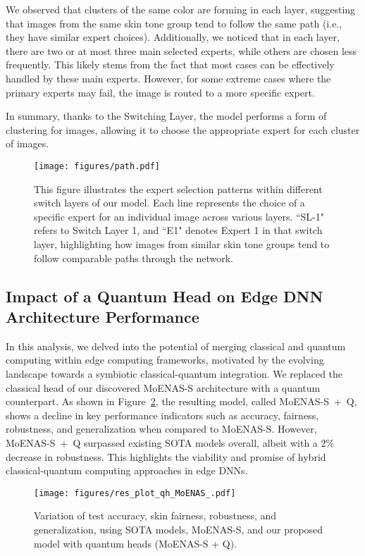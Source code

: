 We observed that clusters of the same color are forming in each layer, suggesting that images from the same skin tone group tend to follow the same path (i.e., they have similar expert choices). Additionally, we noticed that in each layer, there are two or at most three main selected experts, while others are chosen less frequently. This likely stems from the fact that most cases can be effectively handled by these main experts. However, for some extreme cases where the primary experts may fail, the image is routed to a more specific expert.

In summary, thanks to the Switching Layer, the model performs a form of clustering for images, allowing it to choose the appropriate expert for each cluster of images.

\begin{figure}[ht]
    \centering
    \texttt{[image: figures/path.pdf]}
    \caption{This figure illustrates the expert selection patterns within different switch layers of our model. Each line represents the choice of a specific expert for an individual image across various layers. ``SL-1" refers to Switch Layer 1, and ``E1" denotes Expert 1 in that switch layer, highlighting how images from similar skin tone groups tend to follow comparable paths through the network.}
    \label{fig:expert_choice}
\end{figure}

\subsection{Impact of a Quantum Head on Edge DNN Architecture Performance}
\label{app:quantum}
In this analysis, we delved into the potential of merging classical and quantum computing within edge computing frameworks, motivated by the evolving landscape towards a symbiotic classical-quantum integration\cite{furutanpey2023architectural}. We replaced the classical head of our discovered MoENAS-S architecture with a quantum counterpart. As shown in Figure~\ref{fig:res_plot_qh_}, the resulting model, called \mbox{MoENAS-S + Q}, shows a decline in key performance indicators such as accuracy, fairness, robustness, and generalization when compared to MoENAS-S. However, \mbox{MoENAS-S + Q} surpassed existing SOTA models overall, albeit with a 2\% decrease in robustness. This highlights the viability and promise of hybrid classical-quantum computing approaches in edge DNNs.

\begin{figure}
        \centering
\texttt{[image: figures/res\_plot\_qh\_MoENAS\_.pdf]}
        \caption{Variation of test accuracy, skin fairness, robustness, and generalization, using SOTA models, MoENAS-S, and our proposed model with quantum heads (MoENAS-S + Q).}
        
\label{fig:res_plot_qh_}
\end{figure}
